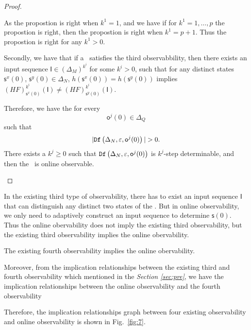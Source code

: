 \begin{proof}
\begin{itemize}
As the propostion is right when $k^1 =1$, and we have if for $k^1=1,\ldots, p$ the propostion is right, then the propostion is right when $k^1=p+1$. Thus the propostion is right for any $k^1>0$.

Secondly, we have that if a \BCN\ satisfies the third observabbility, then there exists an input sequence $\mathsf{I}\in(\Delta_M)^{k^i}$ for some $k^i >0$, such that for any distinct states $\mathsf{s}^{x}(0)$, $\mathsf{s}^{y}(0) \in \Delta_N$, $h(\mathsf{s}^{x}(0))=h(\mathsf{s}^{y}(0))$ implies $(HF)^{k^i}_{\mathsf{s}^{x}(0)}(\mathsf{I})\neq (HF)^{k^i}_{\mathsf{s}^{y}(0)}(\mathsf{I})$. 

Therefore, we have the for every \[\mathsf{o}^{j}(0)\in \Delta_Q\] such that \[|\Ded\left(\Delta_N,\varepsilon, \mathsf{o}^{j}(0)\right)|> 0.\] There exists a $k^{j}\ge0$ such that ${\tt Df}\left(\Delta_N,\varepsilon,\mathsf{o}^{j}(0)\right)$ is $k^{j}$-step determinable, and then the \BCN\ is online observable.
 \end{itemize}
\end{proof}

In the existing third type of observability, there has to exist an input sequence $\mathsf{I}$ that can distinguish any distinct two states of the \BCN. But in online observability, we only need to adaptively construct an input sequence to determine $\mathsf{s}(0)$. Thus the online obervability does not imply the existing third observability, but the existing third observability implies the online obervability. 

\begin{theorem}
The existing fourth observability implies the online obervability.
\label{theo:5}
\end{theorem}

Moreover, from the implication relationships between the existing third and fourth observability which mentioned in the {\em Section \ref{sec:pre}}, we have the implication relationships between the online observability and the fourth observability

Therefore, the implication relationships graph between four existing observability and online observability is shown in Fig.~\ref{fig:7}.


